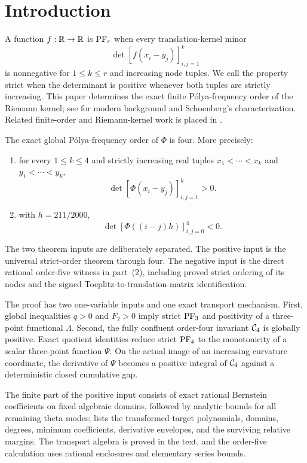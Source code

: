 \section{Introduction}\label{sec:introduction}

A function \(f:\mathbb{R}\to\mathbb{R}\) is \(\mathrm{PF}_r\) when every translation-kernel minor
\[
 \det[f(x_i-y_j)]_{i,j=1}^k
\]
is nonnegative for \(1\leq k\leq r\) and increasing node tuples. We call the
property strict when the determinant is positive whenever both tuples are
strictly increasing. This paper determines the exact finite P\'olya-frequency
order of the Riemann kernel; see \cite{belton} for modern background and
Schoenberg's characterization. Related finite-order and Riemann-kernel work is
placed in .

\begin{theorem}\label{thm:main}
The exact global P\'olya-frequency order of \(\Phi\) is four. More precisely:
\begin{enumerate}
\item for every \(1\leq k\leq4\) and strictly increasing real tuples
\(x_1<\cdots<x_k\) and \(y_1<\cdots<y_k\),
\[
 \det[\Phi(x_i-y_j)]_{i,j=1}^k>0.
\]
\item with \(h=211/2000\),
\[
 \det[\Phi((i-j)h)]_{i,j=0}^4<0.
\]
\end{enumerate}
\end{theorem}

The two theorem inputs are deliberately separated. The positive input is the
universal strict-order theorem through four. The negative input is the direct
rational order-five witness in part~(2), including proved strict ordering of
its nodes and the signed Toeplitz-to-translation-matrix identification.

The proof has two one-variable inputs and one exact transport
mechanism. First, global inequalities \(q>0\) and \(F_2>0\) imply strict
\(\mathrm{PF}_3\) and positivity of a three-point functional \(\Lambda\). Second, the
fully confluent order-four invariant \(\mathcal{C}_4\) is globally positive. Exact
quotient identities reduce strict \(\mathrm{PF}_4\) to the monotonicity of a scalar
three-point function \(\Psi\). On the actual image of an increasing curvature
coordinate, the derivative of \(\Psi\) becomes a positive integral of
\(\mathcal{C}_4\) against a deterministic closed cumulative gap.

The finite part of the positive input consists of exact rational Bernstein
coefficients on fixed algebraic domains, followed by analytic bounds for all
remaining theta modes;  lists the transformed target
polynomials, domains, degrees, minimum coefficients, derivative envelopes,
and the surviving relative margins. The transport algebra is proved in the
text, and the order-five
calculation uses rational enclosures and elementary series bounds.
